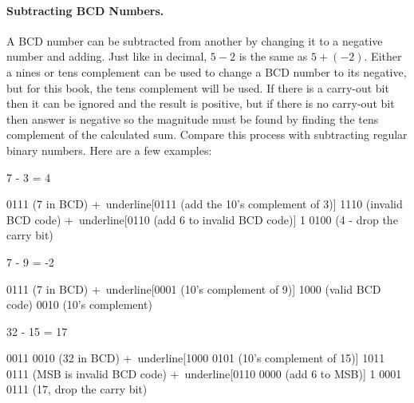 \paragraph{Subtracting BCD Numbers.} A \ac{BCD} number can be subtracted from another by changing it to a negative number and adding. Just like in decimal, $ 5 - 2 $ is the same as $ 5 + (-2) $. Either a nines or tens complement can be used to change a \ac{BCD} number to its negative, but for this book, the tens complement will be used. If there is a carry-out bit then it can be ignored and the result is positive, but if there is no carry-out bit then answer is negative so the magnitude must be found by finding the tens complement of the calculated sum. Compare this process with subtracting regular binary numbers. Here are a few examples:

\begin{minipage}{\linewidth} %
\begin{binDisp}[commandchars=~\[\]]

    7 - 3 = 4

          0111  (7 in BCD)
         +~underline[0111  (add the 10's complement of 3)]
          1110  (invalid BCD code)
         +~underline[0110  (add 6 to invalid BCD code)]
        1 0100  (4 - drop the carry bit)

\end{binDisp}
\end{minipage}

\begin{minipage}{\linewidth} %
\begin{binDisp}[commandchars=~\[\]]

    7 - 9 = -2

          0111  (7 in BCD)
         +~underline[0001  (10's complement of 9)]
          1000  (valid BCD code)
          0010  (10's complement)

\end{binDisp}
\end{minipage}

\begin{minipage}{\linewidth} %
\begin{binDisp}[commandchars=~\[\]]

    32 - 15 = 17

          0011 0010  (32 in BCD)
         +~underline[1000 0101  (10's complement of 15)]
          1011 0111  (MSB is invalid BCD code)
         +~underline[0110 0000  (add 6 to MSB)]
        1 0001 0111  (17, drop the carry bit)

\end{binDisp}
\end{minipage}

